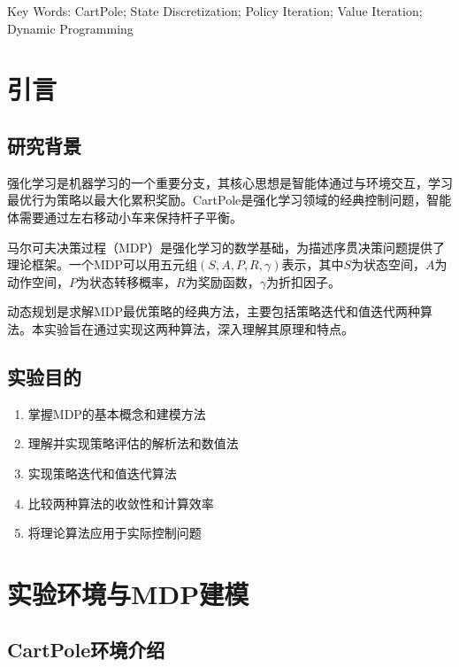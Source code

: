 \documentclass[12pt,a4paper]{article}
\begin{document}
\vspace{0.5em}
{\heiti\fontsize{12pt}{15pt}\selectfont Key Words:} {\fontsize{12pt}{15pt}\selectfont CartPole; State Discretization; Policy Iteration; Value Iteration; Dynamic Programming}

\newpage

\section{引言}

\subsection{研究背景}

强化学习是机器学习的一个重要分支，其核心思想是智能体通过与环境交互，学习最优行为策略以最大化累积奖励。CartPole是强化学习领域的经典控制问题，智能体需要通过左右移动小车来保持杆子平衡。

马尔可夫决策过程（MDP）是强化学习的数学基础，为描述序贯决策问题提供了理论框架。一个MDP可以用五元组$(S, A, P, R, \gamma)$表示，其中$S$为状态空间，$A$为动作空间，$P$为状态转移概率，$R$为奖励函数，$\gamma$为折扣因子。

动态规划是求解MDP最优策略的经典方法，主要包括策略迭代和值迭代两种算法。本实验旨在通过实现这两种算法，深入理解其原理和特点。

\subsection{实验目的}

\begin{enumerate}[itemsep=0pt]
    \item 掌握MDP的基本概念和建模方法
    \item 理解并实现策略评估的解析法和数值法
    \item 实现策略迭代和值迭代算法
    \item 比较两种算法的收敛性和计算效率
    \item 将理论算法应用于实际控制问题
\end{enumerate}

\section{实验环境与MDP建模}

\subsection{CartPole环境介绍}
\end{document}
